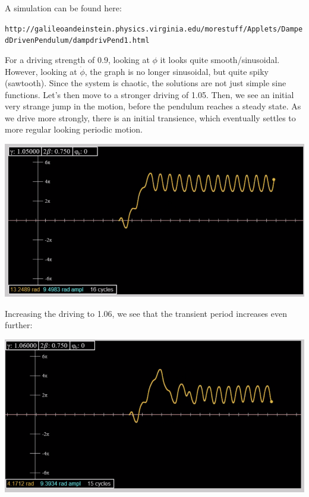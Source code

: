 \documentclass[../PHYS306Notes.tex]{subfiles}
\begin{document}
A simulation can be found here:
\begin{center}
    \texttt{http://galileoandeinstein.physics.virginia.edu/more\textunderscore stuff/Applets/DampedDrivenPendulum/dampdrivPend\textunderscore\textunderscore1.html}
\end{center}

For a driving strength of $0.9$, looking at $\phi$ it looks quite smooth/sinusoidal. However, looking at $\dot{\phi}$, the graph is no longer sinusoidal, but quite spiky (sawtooth). Since the system is chaotic, the solutions are not just simple sine functions. Let's then move to a stronger driving of 1.05. Then, we see an initial very strange jump in the motion, before the pendulum reaches a steady state. As we drive more strongly, there is an initial transience, which eventually settles to more regular looking periodic motion.
\begin{center}
    \includegraphics[scale=0.5]{Lecture-32/l32-img2.png}
\end{center}
Increasing the driving to 1.06, we see that the transient period increases even further:
\begin{center}
    \includegraphics[scale=0.5]{Lecture-32/l32-img3.png}
\end{center}
\end{document}
